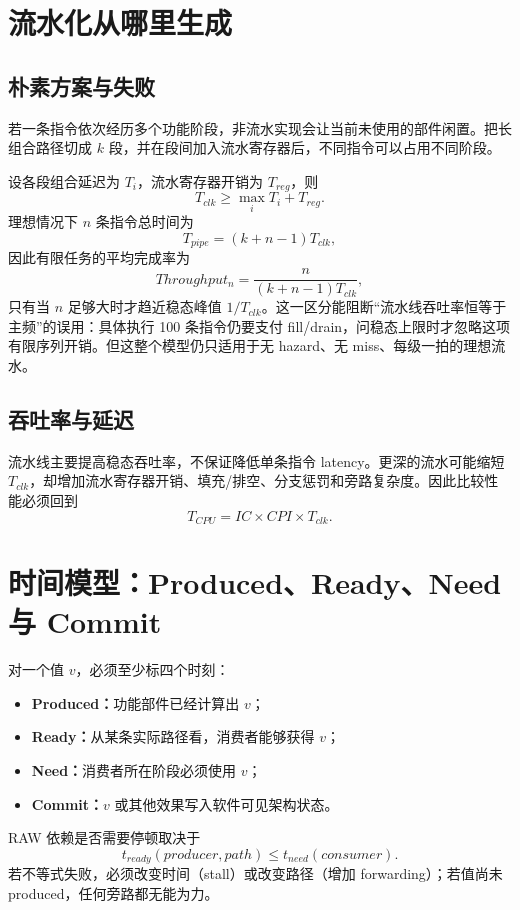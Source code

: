 \documentclass[UTF8,fontset=fandol,11pt,a4paper]{ctexart}
\newcommand{\kw}[1]{\textbf{\color{deep}#1}}
\begin{document}
\tableofcontents
\newpage

\section{流水化从哪里生成}

\subsection{朴素方案与失败}
若一条指令依次经历多个功能阶段，非流水实现会让当前未使用的部件闲置。把长组合路径切成 $k$ 段，并在段间加入流水寄存器后，不同指令可以占用不同阶段。

设各段组合延迟为 $T_i$，流水寄存器开销为 $T_{reg}$，则
\[
T_{clk}\ge \max_i T_i+T_{reg}.
\]
理想情况下 $n$ 条指令总时间为
\[
T_{pipe}=(k+n-1)T_{clk},
\]
因此有限任务的平均完成率为
\[
Throughput_n=\frac{n}{(k+n-1)T_{clk}},
\]
只有当 $n$ 足够大时才趋近稳态峰值 $1/T_{clk}$。这一区分能阻断“流水线吞吐率恒等于主频”的误用：具体执行 100 条指令仍要支付 fill/drain，问稳态上限时才忽略这项有限序列开销。但这整个模型仍只适用于无 hazard、无 miss、每级一拍的理想流水。

\subsection{吞吐率与延迟}
流水线主要提高稳态吞吐率，不保证降低单条指令 latency。更深的流水可能缩短 $T_{clk}$，却增加流水寄存器开销、填充/排空、分支惩罚和旁路复杂度。因此比较性能必须回到
\[
T_{CPU}=IC\times CPI\times T_{clk}.
\]

\section{时间模型：Produced、Ready、Need 与 Commit}

对一个值 $v$，必须至少标四个时刻：
\begin{itemize}
  \item \kw{Produced：}功能部件已经计算出 $v$；
  \item \kw{Ready：}从某条实际路径看，消费者能够获得 $v$；
  \item \kw{Need：}消费者所在阶段必须使用 $v$；
  \item \kw{Commit：}$v$ 或其他效果写入软件可见架构状态。
\end{itemize}

RAW 依赖是否需要停顿取决于
\[
t_{ready}(producer,path)\le t_{need}(consumer).
\]
若不等式失败，必须改变时间（stall）或改变路径（增加 forwarding）；若值尚未 produced，任何旁路都无能为力。
\end{document}
